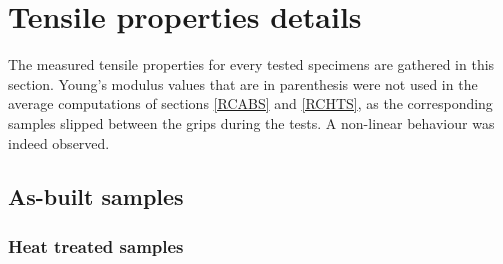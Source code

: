
\chapter{Tensile properties details} %

\label{AppendixAbis} %
The measured tensile properties for every tested specimens are gathered in this section. Young's modulus values that are in parenthesis were not used in the average computations of sections \ref{RCABS} and \ref{RCHTS}, as the corresponding samples slipped between the grips during the tests. A non-linear behaviour was indeed observed.
\section{As-built samples}

 \begin{center}
\begin{table}[ht]
\noindent{}

\caption[Tensile mechanical properties of the as-built specimens from batch X200-180417]{Tensile mechanical properties of the as-built specimens from batch X200-180417}
\label{tab:tracAB}
\end{table}
 \end{center}

\subsection{Heat treated samples}

